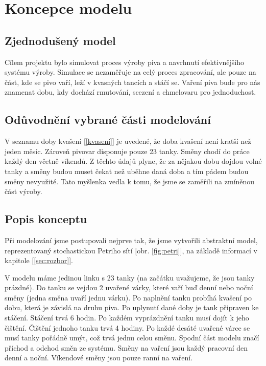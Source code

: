 \documentclass[11pt,a4paper]{article}
\begin{document}
\section{Koncepce modelu}

\subsection{Zjednodušený model}
Cílem projektu bylo simulovat proces výroby piva a navrhnutí efektivnějšího systému výroby. Simulace se nezaměřuje na celý proces zpracování, ale pouze na část, kde se pivo vaří, leží v kvasných tancích a stáčí se. Vaření piva bude pro nás znamenat dobu, kdy dochází rmutování, scezení a chmelovaru pro jednoduchost.

\subsection{Odůvodnění vybrané části modelování}
V seznamu doby kvašení [\ref{kvaseni}] je uvedené, že doba kvašení není kratší než jeden měsíc. Zároveň pivovar disponuje pouze 23 tanky. Směny chodí do práce každý den včetně víkendů. Z těchto údajů plyne, že za nějakou dobu dojdou volné tanky a směny budou muset čekat než uběhne daná doba a tím pádem budou směny nevyužité. Tato myšlenka vedla k tomu, že jsme se zaměřili na zmíněnou část výroby.

\subsection{Popis konceptu}
Při modelování jsme postupovali nejprve tak, že jsme vytvořili abstraktní model, reprezentovaný stochastickou Petriho sítí [obr. \ref{fig:petri}], na základě informací v kapitole [\ref{sec:rozbor}].

V modelu máme jedinou linku s 23 tanky (na začátku uvažujeme, že jsou tanky prázdné). Do tanku se vejdou 2 uvařené várky, které vaří buď denní nebo noční směny (jedna směna uvaří jednu várku). Po naplnění tanku probíhá kvašení po dobu, která je závislá na druhu piva. Po uplynutí dané doby je tank připraven ke stáčení. Stáčení trvá 6 hodin. Po každém vyprázdnění tanku musí dojít k jeho čištění. Čištění jednoho tanku trvá 4 hodiny. Po každé desáté uvařené várce se musí tanky pořádně umýt, což trvá jednu celou směnu. Spodní část modelu značí příchod a odchod směn ze systému. Směny na vaření jsou každý pracovní den denní a noční. Víkendové směny jsou pouze ranní na vaření.
\end{document}

